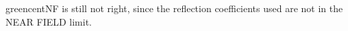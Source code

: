 
\begin{DoxyRefList}
\item[\label{bug__bug000001}%
\Hypertarget{bug__bug000001}%
File \hyperlink{cyl_8h}{cyl.h} ]greencent\+NF is still not right, since the reflection coefficients used are not in the N\+E\+AR F\+I\+E\+LD limit.
\end{DoxyRefList}